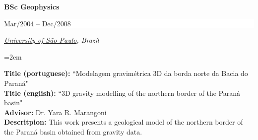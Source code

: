 \documentclass[paper=letter,fontsize=11pt]{scrartcl} %
\newcommand{\sepspace}{\vspace*{1em}}		%
\newcommand{\NewPart}[2]{\section*{\uppercase{#1} #2}}
\newcommand{\EducationEntry}[4]{
		\noindent \textbf{#1} \hfill      %
		\colorbox{White}{%
			\parbox{10em}{%
			\hfill\color{Black}#2}} \par  %
		\noindent \textit{#3} \par        %
		\noindent\hangindent=2em\hangafter=0 \small #4 %
		\normalsize \par}
\begin{document}
\sepspace

\EducationEntry{\Large BSc Geophysics}{\begin{flushright} Mar/2004 -- Dec/2008 \end{flushright} \vspace{-0.2in}}{\href{http://www.iag.usp.br/international/}{University of S\~{a}o Paulo}, Brazil}

\sepspace \noindent
\textbf{Title (portuguese):} ``Modelagem gravim\'{e}trica 3D da borda norte da Bacia do Paran\'{a}" \\
\textbf{Title (english):} ``3D gravity modelling of the northern border of the Paran\'{a} basin" \\
\textbf{Advisor:} Dr. Yara R. Marangoni \\
\textbf{Descritpion:} This work presents a geological model of the northern border of the Paran\'{a} basin obtained from gravity data.

\newpage




\renewcommand{\refname}{PEER-REVIEWED JOURNAL PAPERS (\href{http://orcid.org/0000-0002-6338-4086}{ORCID})}
\nocite{*}


\end{document}
